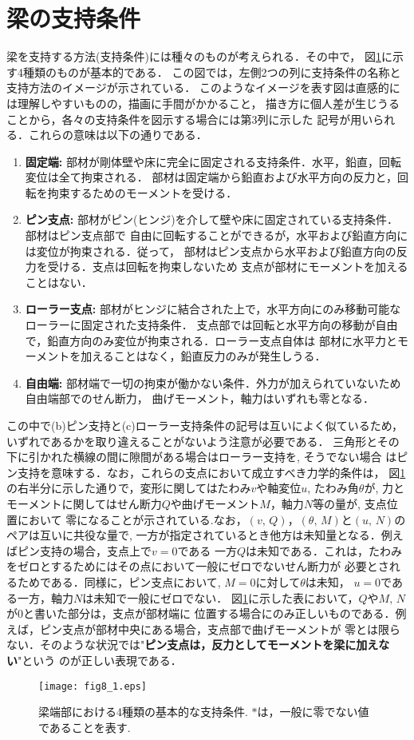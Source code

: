 \documentclass[10pt,a4j]{jbook}
\begin{document}
\section{梁の支持条件}
梁を支持する方法(支持条件)には種々のものが考えられる．その中で，
図\ref{fig:fig8_1}に示す4種類のものが基本的である．
この図では，左側2つの列に支持条件の名称と支持方法のイメージが示されている．
このようなイメージを表す図は直感的には理解しやすいものの，描画に手間がかかること，
描き方に個人差が生じうることから，各々の支持条件を図示する場合には第3列に示した
記号が用いられる．これらの意味は以下の通りである．
\begin{enumerate}
		\renewcommand{\theenumi}{(\alph{enumi})}
\item
	{\bf 固定端:}
	部材が剛体壁や床に完全に固定される支持条件．水平，鉛直，回転変位は全て拘束される．
	部材は固定端から鉛直および水平方向の反力と，回転を拘束するためのモーメントを受ける．
\item
	{\bf ピン支点:}
	部材がピン(ヒンジ)を介して壁や床に固定されている支持条件．部材はピン支点部で
	自由に回転することができるが，水平および鉛直方向には変位が拘束される．従って，
	部材はピン支点から水平および鉛直方向の反力を受ける．支点は回転を拘束しないため
	支点が部材にモーメントを加えることはない．
\item
	{\bf ローラー支点:}
	部材がヒンジに結合された上で，水平方向にのみ移動可能なローラーに固定された支持条件．
	支点部では回転と水平方向の移動が自由で，鉛直方向のみ変位が拘束される．ローラー支点自体は
	部材に水平力とモーメントを加えることはなく，鉛直反力のみが発生しうる．
\item
	{\bf 自由端:}
	部材端で一切の拘束が働かない条件．外力が加えられていないため自由端部でのせん断力，
	曲げモーメント，軸力はいずれも零となる．
\end{enumerate}
この中で(b)ピン支持と(c)ローラー支持条件の記号は互いによく似ているため，
いずれであるかを取り違えることがないよう注意が必要である．
三角形とその下に引かれた横線の間に隙間がある場合はローラー支持を, そうでない場合
はピン支持を意味する．なお，これらの支点において成立すべき力学的条件は，
図\ref{fig:fig8_1}の右半分に示した通りで，変形に関してはたわみ$v$や軸変位$u$, たわみ角$\theta$が, 
力とモーメントに関してはせん断力$Q$や曲げモーメント$M$，軸力$N$等の量が, 支点位置において
零になることが示されている.なお，$(v,\,Q)$，$(\theta,\, M)$と$(u,\, N)$のペアは互いに共役な量で,
一方が指定されているとき他方は未知量となる．例えばピン支持の場合，支点上で$v=0$である
一方$Q$は未知である．これは，たわみをゼロとするためにはその点において一般にゼロでないせん断力が
必要とされるためである．同様に，ピン支点において, $M=0$に対して$\theta$は未知，
$u=0$である一方，軸力$N$は未知で一般にゼロでない．
図\ref{fig:fig8_1}に示した表において，$Q$や$M,\,N$が0と書いた部分は，支点が部材端に
位置する場合にのみ正しいものである．例えば，ピン支点が部材中央にある場合，支点部で曲げモーメントが
零とは限らない．そのような状況では"{\bf ピン支点は，反力としてモーメントを梁に加えない}"という
のが正しい表現である．
\begin{figure}
	\begin{center}
	\texttt{[image: fig8\_1.eps]} 
	\end{center}
	\caption{梁端部における4種類の基本的な支持条件. $*$は，一般に零でない値であることを表す.}
	\label{fig:fig8_1}
\end{figure}
\end{document}
